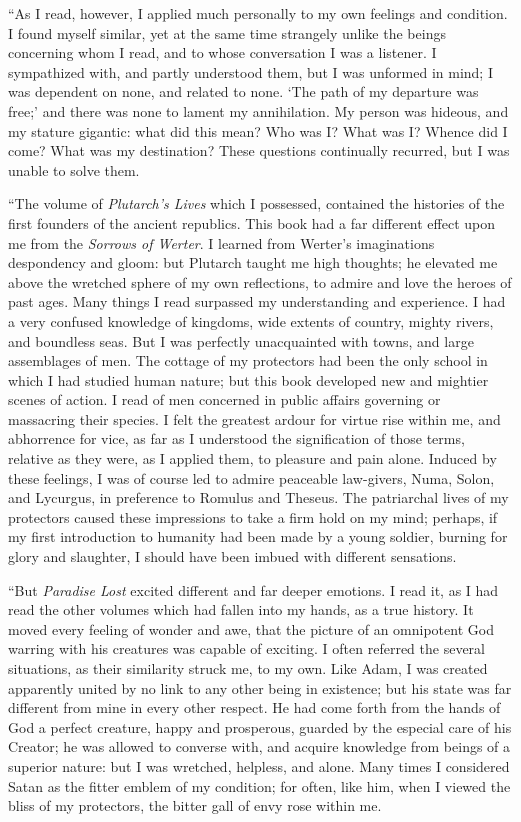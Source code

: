 ``As I read, however, I applied
much personally to my own feelings
and condition. I found myself similar,
yet at the same time strangely unlike
the beings concerning whom I read,
and to whose conversation I was a
listener. I sympathized with, and
partly understood them, but I was
unformed in mind; I was dependent
on none, and related to none. `The
path of my departure was free;' and
there was none to lament my annihilation.
My person was hideous, and
my stature gigantic: what did this
mean? Who was I? What was I?
Whence did I come? What was my
destination? These questions continually
recurred, but I was unable to
solve them.

``The volume of \emph{Plutarch's Lives}
which I possessed, contained the histories
of the first founders of the ancient
republics. This book had a far
different effect upon me from the \emph{Sorrows
of Werter}. I learned from Werter's
imaginations despondency and
gloom: but Plutarch taught me high
thoughts; he elevated me above the
wretched sphere of my own reflections,
to admire and love the heroes of past
ages. Many things I read surpassed
my understanding and experience. I
had a very confused knowledge of kingdoms,
wide extents of country, mighty
rivers, and boundless seas. But I was
perfectly unacquainted with towns, and
large assemblages of men. The cottage
of my protectors had been the only
school in which I had studied human
nature; but this book developed new
and mightier scenes of action. I read
of men concerned in public affairs governing
or massacring their species. I
felt the greatest ardour for virtue rise
within me, and abhorrence for vice, as
far as I understood the signification of
those terms, relative as they were, as I
applied them, to pleasure and pain alone.
Induced by these feelings, I was of course
led to admire peaceable law-givers,
Numa, Solon, and Lycurgus, in preference
to Romulus and Theseus. The
patriarchal lives of my protectors caused
these impressions to take a firm hold on
my mind; perhaps, if my first introduction
to humanity had been made by a
young soldier, burning for glory and
slaughter, I should have been imbued
with different sensations.

``But \emph{Paradise Lost} excited different
and far deeper emotions. I read it, as I
had read the other volumes which had
fallen into my hands, as a true history.
It moved every feeling of wonder and
awe, that the picture of an omnipotent
God warring with his creatures was
capable of exciting. I often referred
the several situations, as their similarity
struck me, to my own. Like Adam, I
was created apparently united by no
link to any other being in existence;
but his state was far different from mine
in every other respect. He had come
forth from the hands of God a perfect
creature, happy and prosperous, guarded
by the especial care of his Creator;
he was allowed to converse with, and
acquire knowledge from beings of a
superior nature: but I was wretched,
helpless, and alone. Many times I
considered Satan as the fitter emblem of
my condition; for often, like him, when
I viewed the bliss of my protectors, the
bitter gall of envy rose within me.

